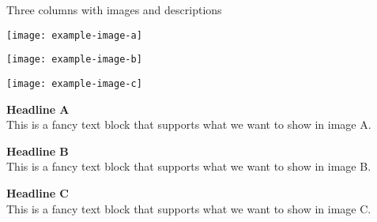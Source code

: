 \begin{frame}[c]{Three columns with images and descriptions}
%
\begin{minipage}{0.3\textwidth}
	\texttt{[image: example-image-a]}
\end{minipage}\hfill
\begin{minipage}{0.3\textwidth}
	\texttt{[image: example-image-b]}
\end{minipage}\hfill
\begin{minipage}{0.3\textwidth}
	\texttt{[image: example-image-c]}
\end{minipage}
\vfill
\begin{minipage}{0.3\textwidth}
	\centering
	\textbf{Headline A}\\
	
	This is a fancy text block that supports what we want to show in image A.
\end{minipage}\hfill
\begin{minipage}{0.3\textwidth}
	\centering
	\textbf{Headline B}\\
	
	This is a fancy text block that supports what we want to show in image B.
\end{minipage}\hfill
\begin{minipage}{0.3\textwidth}
	\centering
	\textbf{Headline C}\\
	
	This is a fancy text block that supports what we want to show in image C.
\end{minipage}
%
\end{frame}
